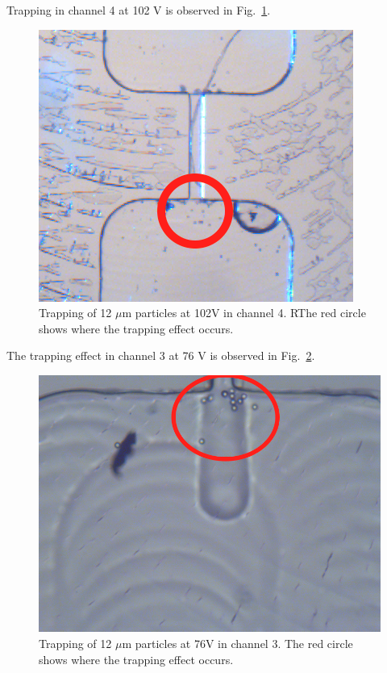 \documentclass[journal, a4paper]{IEEEtran}
\begin{document}
Trapping in channel 4 at 102 V is observed in Fig.~\ref{fig:4-102V}.

\begin{figure}[!hbt]
	\begin{center}
		\includegraphics[width=\columnwidth]{4-102V.png}
		\caption{\label{fig:4-102V} Trapping of 12 $\mu$m particles at 102V in channel 4. RThe red circle shows where the trapping effect occurs.}
	\end{center}
\end{figure}

The trapping effect in channel 3 at 76 V is observed in Fig.~\ref{fig:3-76V}.
\begin{figure}[!hbt]
	\begin{center}
		\includegraphics[width=\columnwidth]{3-76V.png}
		\caption{\label{fig:3-76V} Trapping of 12 $\mu$m particles at 76V in channel 3. The red circle shows where the trapping effect occurs.}
	\end{center}
\end{figure}
\end{document}
